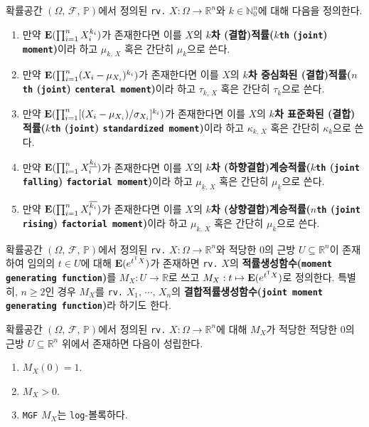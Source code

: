 \begin{definition}
    확률공간 $(\Omega,\,\mathcal{F},\,\mathbb{P})$에서 정의된 \texttt{rv.} $X:\Omega\to\mathbb{R}^n$와 $k\in\mathbb{N}_0^n$에 대해 다음을 정의한다.
    \begin{enumerate}
        \item 만약 $\mathbf{E}(\prod_{i=1}^nX_i^{k_i})$가 존재한다면 이를 $X$의 \textbf{$k$차 (결합)적률($k$\texttt{th} (\texttt{joint}) \texttt{moment})}이라 하고 $\mu_{k,\,X}$ 혹은 간단히 $\mu_k$으로 쓴다.
        \item 만약 $\mathbf{E}(\prod_{i=1}^n(X_i-\mu_{X_i})^{k_i})$가 존재한다면 이를 $X$의 \textbf{$k$차 중심화된 (결합)적률($n$\texttt{th} (\texttt{joint}) \texttt{centeral moment})}이라 하고 $\tau_{k,\,X}$ 혹은 간단히 $\tau_k$으로 쓴다.
        \item 만약 $\mathbf{E}(\prod_{i=1}^n[(X_i-\mu_{X_i})/\sigma_{X_i}]^{k_i})$가 존재한다면 이를 $X$의 \textbf{$k$차 표준화된 (결합)적률($k$\texttt{th} (\texttt{joint}) \texttt{standardized moment})}이라 하고 $\kappa_{k,\,X}$ 혹은 간단히 $\kappa_k$으로 쓴다.
        \item 만약 $\mathbf{E}(\prod_{i=1}^nX_i^{\underline{k_i}})$가 존재한다면 이를 $X$의 \textbf{$k$차 (하향결합)계승적률($k$\texttt{th} (\texttt{joint falling}) \texttt{factorial moment})}이라 하고 $\mu_{\underline{k},\,X}$ 혹은 간단히 $\mu_{\underline{k}}$으로 쓴다.
        \item 만약 $\mathbf{E}(\prod_{i=1}^nX_i^{\overline{k_i}})$가 존재한다면 이를 $X$의 \textbf{$k$차 (상향결합)계승적률($n$\texttt{th} (\texttt{joint rising}) \texttt{factorial moment})}이라 하고 $\mu_{\overline{k},\,X}$ 혹은 간단히 $\mu_{\overline{k}}$으로 쓴다.
    \end{enumerate}
\end{definition}

\begin{definition}
    확률공간 $(\Omega,\,\mathcal{F},\,\mathbb{P})$에서 정의된 \texttt{rv.} $X:\Omega\to\mathbb{R}^n$와 적당한 $0$의 근방 $U\subseteq\mathbb{R}^n$이 존재하여 임의의 $t\in U$에 대해 $\mathbf{E}(e^{t^{\mathsf{T}} X})$가 존재하면 \texttt{rv.} $X$의 \textbf{적률생성함수(\texttt{moment generating function})}를 $M_X:U\to\mathbb{R}$로 쓰고 $M_X:t\mapsto\mathbf{E}(e^{t^{\mathsf{T}} X})$로 정의한다. 특별히, $n\geq2$인 경우 $M_X$를 \texttt{rv.} $X_1,\,\cdots,\,X_n$의 \textbf{결합적률생성함수(\texttt{joint moment generating function})}라 하기도 한다.
\end{definition}

\begin{theorem}
    확률공간 $(\Omega,\,\mathcal{F},\,\mathbb{P})$에서 정의된 \texttt{rv.} $X:\Omega\to\mathbb{R}^n$에 대해 $M_X$가 적당한 적당한 $0$의 근방 $U\subseteq\mathbb{R}^n$ 위에서 존재하면 다음이 성립한다.
    \begin{enumerate}
        \item $M_X(0)=1$.
        \item $M_X>0$.
        \item \texttt{MGF} $M_X$는 \texttt{log}-볼록하다.
    \end{enumerate}
\end{theorem}

